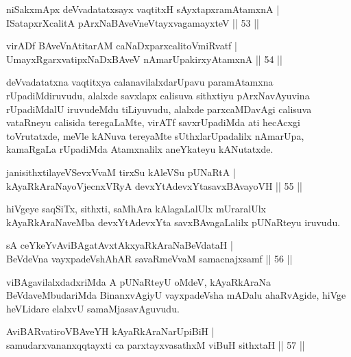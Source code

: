 
\begin{shl}
niSakxmApx deVvadatatxsayx vaqtitxH sAyxtapxramAtamxnA  | \\
ISatapxrXcalitA pArxNaBAveVneVtayxvagamayxteV \hfill||  53 ||  
\end{shl}

\begin{shl}
virADf BAveVnAtitarAM caNaDxparxcalitoVmiRvatf  | \\
UmayxRgarxvatipxNaDxBAveV nAmarUpakirxyAtamxnA \hfill||  54 ||  
\end{shl}

\begin{artha}
deVvadatatxna vaqtitxya calanavilalxdarUpavu paramAtamxna rUpadiMdiruvudu, alalxde savxlapx calisuva sithxtiyu pArxNavAyuvina rUpadiMdalU iruvudeMdu tiLiyuvudu, alalxde parxcaMDavAgi calisuva vataRneyu calisida teregaLaMte, virATf savxrUpadiMda ati hecAcxgi toVrutatxde, meVle kANuva tereyaMte sUthxlarUpadalilx nAmarUpa, kamaRgaLa rUpadiMda Atamxnalilx aneYkateyu kANutatxde.
\end{artha}


\begin{shl}
janisithxtilayeVSevxVvaM tirxSu kAleVSu pUNaRtA  | \\
kAyaRkAraNayoVjecnxVRyA devxYtAdevxYtasavxBAvayoVH \hfill||  55 ||  
\end{shl}

\begin{artha}
hiVgeye saqSiTx, sithxti, saMhAra kAlagaLalUlx mUraralUlx kAyaRkAraNaveMba devxYtAdevxYta savxBAvagaLalilx pUNaRteyu iruvudu.
\end{artha}

\begin{shl}
sA ceYkeYvAviBAgatAvxtAkxyaRkAraNaBeVdataH  | \\
BeVdeVna vayxpadeVshAhAR savaRmeVvaM samacnajxsamf \hfill||  56 ||  
\end{shl}

\begin{artha}
viBAgavilalxdadxriMda A pUNaRteyU oMdeV, kAyaRkAraNa BeVdaveMbudariMda BinanxvAgiyU vayxpadeVsha mADalu ahaRvAgide, hiVge heVLidare elalxvU samaMjasavAguvudu.
\end{artha}

\begin{shl}
AviBARvatiroVBAveYH kAyaRkAraNarUpiBiH  | \\
samudarxvananxqqtayxti ca parxtayxvasathxM viBuH sithxtaH \hfill||  57 ||  
\end{shl}


